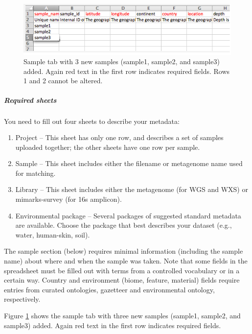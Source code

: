 \documentclass[12pt,fullpage]{report}
\begin{document}
\begin{figure}[ht]
\begin{center}
\includegraphics[width=6in]{Images/project-spreadsheet-with-3-samples.png}
\end{center}
\caption{
Sample tab with 3 new samples (sample1, sample2, and sample3) added. Again red text in the first row indicates required fields. Rows 1 and 2 cannot be altered.
}
\label{fig:project-spreadsheet-with-3-samples}
\end{figure}

\subparagraph*{Required sheets}
You need to fill out four sheets to describe your metadata:

\begin{enumerate}
\item Project --
This sheet has only one row, and describes a set of samples uploaded together; the other sheets have one row per sample.

\item Sample --
This sheet includes either the filename or metagenome name used for matching.

\item Library --
This sheet includes either the metagenome (for WGS and WXS) or mimarks-survey (for \gls{16s} amplicon).

\item Environmental package --
Several packages of suggested standard metadata are available.
Choose the package that best describes your dataset (e.g., water, human-skin, soil).

\end{enumerate}

The sample section (below) requires minimal information (including the sample name) about where and when the sample was taken. Note that some fields in the spreadsheet must be filled out with terms from a controlled vocabulary or in a certain way. Country and environment (biome, feature, material) fields require entries from curated ontologies, gazetteer and environmental ontology, respectively.


Figure \ref{fig:project-spreadsheet-with-3-samples}
shows the sample tab with three new samples (sample1, sample2, and sample3) added. Again red text in the first row indicates required fields.
\end{document}
